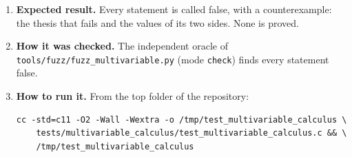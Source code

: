 \documentclass[11pt,a4paper]{article}
\begin{document}
\begin{enumerate}
\item \textbf{Expected result.} Every statement is called false, with a counterexample: the thesis that fails and the values of its two sides. None is proved.

\item \textbf{How it was checked.} The independent oracle of \texttt{tools/fuzz/fuzz\_multivariable.py} (mode \texttt{check}) finds every statement false.

\item \textbf{How to run it.} From the top folder of the repository:
\begin{verbatim}
cc -std=c11 -O2 -Wall -Wextra -o /tmp/test_multivariable_calculus \
    tests/multivariable_calculus/test_multivariable_calculus.c && \
    /tmp/test_multivariable_calculus
\end{verbatim}
\end{enumerate}
\end{document}

